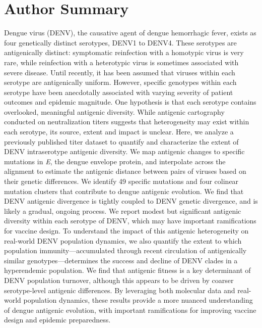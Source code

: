 \documentclass[11pt,oneside,letterpaper]{article}
\begin{document}
\section*{Author Summary}
Dengue virus (DENV), the causative agent of dengue hemorrhagic fever, exists as four genetically distinct serotypes, DENV1 to DENV4.
These serotypes are antigenically distinct: symptomatic reinfection with a homotypic virus is very rare, while reinfection with a heterotypic virus is sometimes associated with severe disease.
Until recently, it has been assumed that viruses within each serotype are antigenically uniform.
However, specific genotypes within each serotype have been anecdotally associated with varying severity of patient outcomes and epidemic magnitude.
One hypothesis is that each serotype contains overlooked, meaningful antigenic diversity.
While antigenic cartography conducted on neutralization titers suggests that heterogeneity may exist within each serotype, its source, extent and impact is unclear.
Here, we analyze a previously published titer dataset to quantify and characterize the extent of DENV intraserotype antigenic diversity.
We map antigenic changes to specific mutations in \textit{E}, the dengue envelope protein, and interpolate across the alignment to estimate the antigenic distance between pairs of viruses based on their genetic differences.
We identify 49 specific mutations and four colinear mutation clusters that contribute to dengue antigenic evolution.
We find that DENV antigenic divergence is tightly coupled to DENV genetic divergence, and is likely a gradual, ongoing process.
We report modest but significant antigenic diversity within each serotype of DENV, which may have important ramifications for vaccine design.
To understand the impact of this antigenic heterogeneity on real-world DENV population dynamics, we also quantify the extent to which population immunity---accumulated through recent circulation of antigenically similar genotypes---determines the success and decline of DENV clades in a hyperendemic population.
We find that antigenic fitness is a key determinant of DENV population turnover, although this appears to be driven by coarser serotype-level antigenic differences.
By leveraging both molecular data and real-world population dynamics, these results provide a more nuanced understanding of dengue antigenic evolution, with important ramifications for improving vaccine design and epidemic preparedness.

\pagebreak
\end{document}
